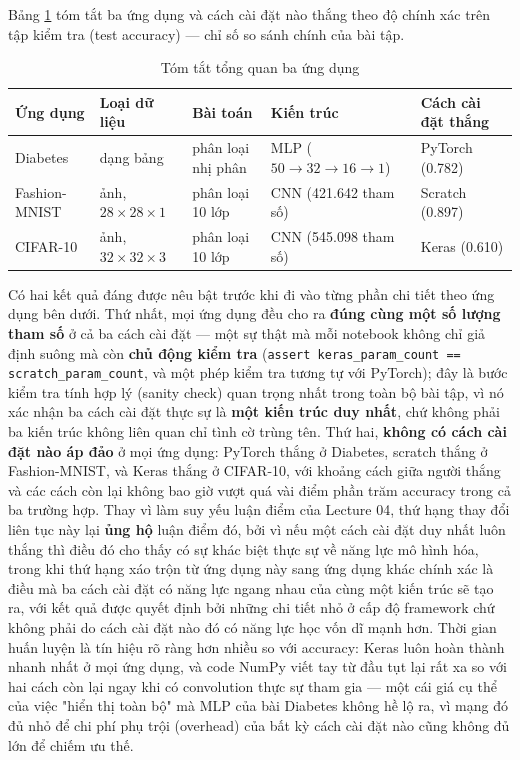 \documentclass[11pt]{article}
\newcommand{\code}[1]{\texttt{#1}}
\begin{document}
Bảng \ref{tab:exec-summary} tóm tắt ba ứng dụng và cách cài đặt nào thắng
theo độ chính xác trên tập kiểm tra (test accuracy) — chỉ số so sánh chính
của bài tập.

\begin{table}[H]
\centering
\caption{Tóm tắt tổng quan ba ứng dụng}
\label{tab:exec-summary}
\small
\begin{tabular}{@{}p{2.2cm}p{2.4cm}p{2.6cm}p{2.9cm}p{2.6cm}@{}}
\toprule
Ứng dụng & Loại dữ liệu & Bài toán & Kiến trúc & Cách cài đặt thắng \\
\midrule
Diabetes & dạng bảng & phân loại nhị phân & MLP ($50 \to 32 \to 16 \to 1$) & PyTorch (0.782) \\
Fashion-MNIST & ảnh, $28\times28\times1$ & phân loại 10 lớp & CNN (421.642 tham số) & Scratch (0.897) \\
CIFAR-10 & ảnh, $32\times32\times3$ & phân loại 10 lớp & CNN (545.098 tham số) & Keras (0.610) \\
\bottomrule
\end{tabular}
\end{table}

Có hai kết quả đáng được nêu bật trước khi đi vào từng phần chi tiết theo
ứng dụng bên dưới. Thứ nhất, mọi ứng dụng đều cho ra \textbf{đúng cùng một
số lượng tham số} ở cả ba cách cài đặt — một sự thật mà mỗi notebook không
chỉ giả định suông mà còn \textbf{chủ động kiểm tra}
(\code{assert keras\_param\_count == scratch\_param\_count}, và một phép
kiểm tra tương tự với PyTorch); đây là bước kiểm tra tính hợp lý (sanity
check) quan trọng nhất trong toàn bộ bài tập, vì nó xác nhận ba cách cài
đặt thực sự là \textbf{một kiến trúc duy nhất}, chứ không phải ba kiến trúc
không liên quan chỉ tình cờ trùng tên. Thứ hai, \textbf{không có cách cài
đặt nào áp đảo} ở mọi ứng dụng: PyTorch thắng ở Diabetes, scratch thắng ở
Fashion-MNIST, và Keras thắng ở CIFAR-10, với khoảng cách giữa người thắng
và các cách còn lại không bao giờ vượt quá vài điểm phần trăm accuracy
trong cả ba trường hợp. Thay vì làm suy yếu luận điểm của Lecture 04, thứ
hạng thay đổi liên tục này lại \textbf{ủng hộ} luận điểm đó, bởi vì nếu một
cách cài đặt duy nhất luôn thắng thì điều đó cho thấy có sự khác biệt thực
sự về năng lực mô hình hóa, trong khi thứ hạng xáo trộn từ ứng dụng này
sang ứng dụng khác chính xác là điều mà ba cách cài đặt có năng lực ngang
nhau của cùng một kiến trúc sẽ tạo ra, với kết quả được quyết định bởi
những chi tiết nhỏ ở cấp độ framework chứ không phải do cách cài đặt nào
đó có năng lực học vốn dĩ mạnh hơn. Thời gian huấn luyện là tín hiệu rõ
ràng hơn nhiều so với accuracy: Keras luôn hoàn thành nhanh nhất ở mọi ứng
dụng, và code NumPy viết tay từ đầu tụt lại rất xa so với hai cách còn lại
ngay khi có convolution thực sự tham gia — một cái giá cụ thể của việc
"hiển thị toàn bộ" mà MLP của bài Diabetes không hề lộ ra, vì mạng đó đủ
nhỏ để chi phí phụ trội (overhead) của bất kỳ cách cài đặt nào cũng không
đủ lớn để chiếm ưu thế.
\end{document}
